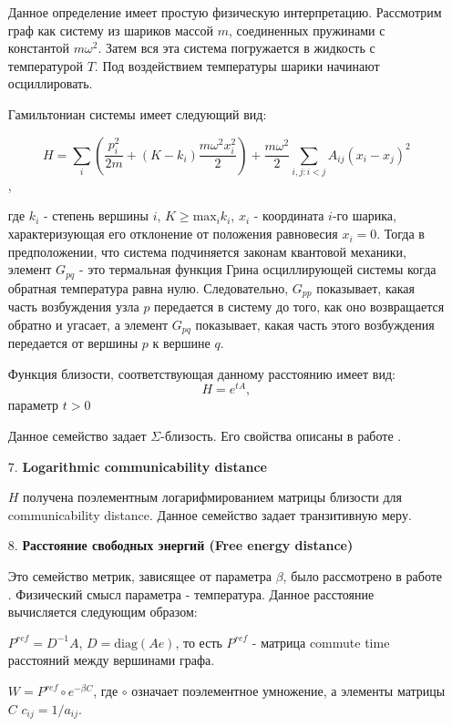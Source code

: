 \begin{itemize}
Данное определение имеет простую физическую интерпретацию. Рассмотрим граф как систему из шариков массой $m$, соединенных пружинами с константой $m \omega ^2$. Затем вся эта система погружается в жидкость с температурой $T$. Под воздействием температуры шарики начинают осциллировать.

Гамильтониан системы имеет следующий вид:

$$H = \sum\limits_{i} \left(\frac{p_i^2}{2m} + (K-k_i)\frac{m\omega ^2 x_i^2}{2}\right) + \frac{m \omega ^2}{2} \sum\limits_{i,j : i<j} A_{ij} (x_i-x_j)^2 $$,

где $k_i$ - степень вершины $i$, $K \ge \text{max}_i k_i$, $x_i$ - координата $i$-го шарика, характеризующая его отклонение от положения равновесия $x_i =0$. Тогда в предположении, что система подчиняется законам квантовой механики, элемент $G_{pq}$ - это термальная функция Грина осциллирующей системы когда обратная температура равна нулю. Следовательно, $G_{pp}$ показывает, какая часть возбуждения узла $p$ передается в систему до того, как оно возвращается обратно и угасает, а элемент $G_{pq}$ показывает, какая часть этого возбуждения передается от вершины $p$ к вершине $q$. 


Функция близости, соответствующая данному расстоянию имеет вид:
\begin{equation}
H = e^{tA},
\end{equation}
 параметр $t > 0$
 
Данное семейство задает $\Sigma$-близость. Его свойства описаны в работе \cite{estrada2012communicability}.

\item[7.] \textbf{Logarithmic communicability distance}

$H$ получена поэлементным логарифмированием матрицы близости для communicability distance. Данное семейство задает транзитивную меру.

\item[8.] \textbf{Расстояние свободных энергий (Free energy distance)}

Это семейство метрик, зависящее от параметра $\beta$, было рассмотрено в работе \cite{kivimaki2014developments}. Физический смысл параметра - температура. Данное расстояние вычисляется следующим образом:

$P^{ref} = D^{-1}A$, $D = \text{diag}(Ae)$, то есть $P^{ref}$ - матрица commute time расстояний между вершинами графа.

$W = P^{ref} \circ e^{-\beta C}$, где $\circ$ означает поэлементное умножение, а элементы матрицы $C$ $c_{ij} = 1 / a_{ij}.$


\end{itemize}
